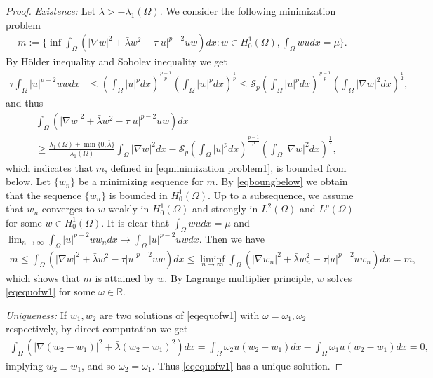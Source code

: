 \documentclass[10pt,a4paper]{article}
\theoremstyle{definition} \theoremstyle{remark}
\numberwithin{equation}{section}
\newcommand{\R}{\mathbb{R}}
\newcommand{\la}{\lambda}
\begin{document}
\begin{proof}
	\emph{Existence:} Let $\bar\la > -\la_1(\Omega)$. We consider the following minimization problem
    \begin{align} \label{eqminimization problem1}
    	m := \big\{\inf \int_\Omega \left(|\nabla w|^2 + \bar \la w^2 - \tau|u|^{p-2}uw \right)dx: w \in H_0^1(\Omega), \int_\Omega wu dx = \mu \big\}.
    \end{align}
	By H\"older inequality and Sobolev inequality we get
	\begin{align*}
		\tau\int_\Omega|u|^{p-2}uw dx & \leq \left(\int_\Omega|u|^pdx\right)^{\frac{p-1}p}\left(\int_\Omega|w|^pdx\right)^{\frac1p} \leq \mathcal{S}_p\left(\int_\Omega|u|^pdx\right)^{\frac{p-1}p}\left(\int_\Omega |\nabla w|^2dx\right)^{\frac12},
	\end{align*}
	and thus
	\begin{align} \label{eqboungbelow}
		&\int_\Omega \left(|\nabla w|^2 + \bar \la w^2 - \tau|u|^{p-2}uw \right)dx \nonumber \\
& \geq \frac{\la_1(\Omega)+\min\{0,\bar \la\}}{\la_1(\Omega)}\int_\Omega |\nabla w|^2dx - \mathcal{S}_p\left(\int_\Omega|u|^pdx\right)^{\frac{p-1}p}\left(\int_\Omega |\nabla w|^2dx\right)^{\frac12},
	\end{align}
	which indicates that $m$, defined in \eqref{eqminimization problem1}, is bounded from below. Let $\{w_n\}$ be a minimizing sequence for $m$. By \eqref{eqboungbelow} we obtain that the sequence $\{w_n\}$ is bounded in $H_0^1(\Omega)$. Up to a subsequence, we assume that $w_n$ converges to $w$ weakly in $H_0^1(\Omega)$ and strongly in $L^2(\Omega)$ and $L^p(\Omega)$ for some $w \in H_0^1(\Omega)$. It is clear that $\int_\Omega wu dx = \mu$ and $\lim_{n \to \infty}\int_\Omega |u|^{p-2}uw_ndx \to \int_\Omega |u|^{p-2}uw dx$. Then we have
	\begin{align*}
		m \leq \int_\Omega \left(|\nabla w|^2 + \bar \la w^2 - \tau|u|^{p-2}uw \right)dx \leq \liminf_{n \to \infty}\int_\Omega \left(|\nabla w_n|^2 + \bar \la w_n^2 - \tau|u|^{p-2}uw_n \right)dx = m,
	\end{align*}
	which shows that $m$ is attained by $w$. By Lagrange multiplier principle, $w$ solves \eqref{eqequofw1} for some $\omega \in \R$.
	
	\vskip0.1in
	\emph{Uniqueness:} If $w_1, w_2$ are two solutions of \eqref{eqequofw1} with $\omega = \omega_1,\omega_2$ respectively, by direct computation we get
    \begin{align}
    	\int_\Omega\left( |\nabla (w_2-w_1)|^2 + \bar \la (w_2-w_1)^2\right) dx = \int_\Omega \omega_2 u(w_2-w_1)dx - \int_\Omega \omega_1 u(w_2-w_1)dx = 0,
    \end{align}
    implying $w_2 \equiv w_1$, and so $\omega_2 = \omega_1$. Thus \eqref{eqequofw1} has a unique solution.


\end{proof}
\end{document}
